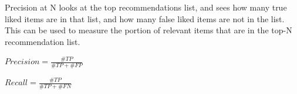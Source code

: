 Precision at N looks at the top recommendations list, and sees how many true liked items are in that list, and how many false liked items are not in the list. This can be used to measure the portion of relevant items that are in the top-N recommendation list.

\begin{math}
Precision = \frac{\#TP}{\#TP + \#FP}
\end{math}

\begin{math}
Recall = \frac{\#TP}{\#TP + \#FN}
\end{math}





